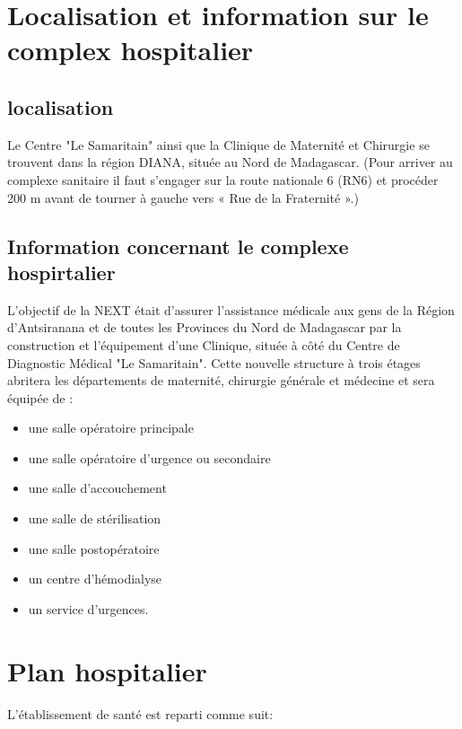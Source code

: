   	\medskip
  	
  
		
		\section{Localisation et  information sur le complex hospitalier}
		
		
		\subsection{localisation}
		Le Centre "Le Samaritain" ainsi que la Clinique de Maternité et Chirurgie se trouvent dans la
		région DIANA, située au Nord de Madagascar.
		(Pour arriver au complexe sanitaire il faut s'engager sur la route nationale 6 (RN6) et
		procéder 200 m avant de tourner à gauche vers « Rue de la Fraternité ».)
		
		\subsection{ Information concernant le complexe hospirtalier}
		
		L'objectif de la NEXT était d'assurer l'assistance médicale aux gens de la Région
		d'Antsiranana et de toutes les Provinces du Nord de Madagascar par la construction et
		l'équipement d'une Clinique, située à côté du Centre de Diagnostic Médical "Le Samaritain".
		Cette nouvelle structure à trois étages abritera les départements de maternité, chirurgie
		générale et médecine et sera équipée de :
		
		\begin{itemize}
			\item une salle opératoire principale

			\item une salle opératoire d'urgence ou secondaire

			\item une salle d'accouchement
			
			\item une salle de stérilisation

			\item une salle postopératoire
			
			\item un centre d'hémodialyse
			
			\item  un service d'urgences.
		\end{itemize}
		
		
		\section{Plan hospitalier}
		L'établissement de santé est reparti comme suit:
	
